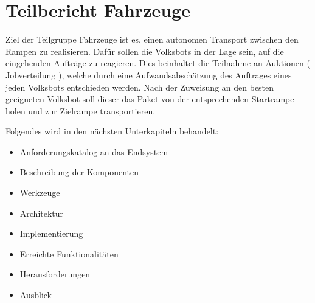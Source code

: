 \section{Teilbericht Fahrzeuge}

Ziel der Teilgruppe Fahrzeuge ist es, einen autonomen Transport zwischen den Rampen zu realisieren. Dafür sollen die Volksbots in der Lage sein, auf die eingehenden Aufträge zu reagieren.
Dies beinhaltet die Teilnahme an Auktionen ( Jobverteilung ), welche durch eine Aufwandsabschätzung des Auftrages eines jeden Volksbots entschieden werden. Nach der Zuweisung an den besten geeigneten Volksbot soll dieser das Paket von der entsprechenden Startrampe holen und zur Zielrampe transportieren.


Folgendes wird in den nächsten Unterkapiteln behandelt:

\begin{itemize}
	\item Anforderungskatalog an das Endsystem
	\item Beschreibung der Komponenten
	\item Werkzeuge
	\item Architektur
	\item Implementierung
	\item Erreichte Funktionalitäten
	\item Herausforderungen
	\item Ausblick
\end{itemize} 



































